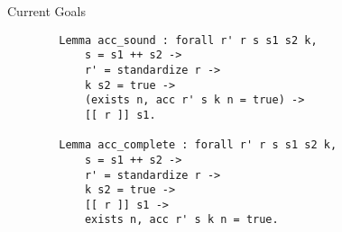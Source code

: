 \documentclass[10pt]{beamer}
\begin{document}
\begin{frame}[fragile]{Current Goals}
\begin{verbatim}
        Lemma acc_sound : forall r' r s s1 s2 k,
            s = s1 ++ s2 ->
            r' = standardize r ->
            k s2 = true ->
            (exists n, acc r' s k n = true) ->
            [[ r ]] s1.

        Lemma acc_complete : forall r' r s s1 s2 k,
            s = s1 ++ s2 ->
            r' = standardize r ->
            k s2 = true ->
            [[ r ]] s1 ->
            exists n, acc r' s k n = true.
\end{verbatim}
\end{frame}
\end{document}
